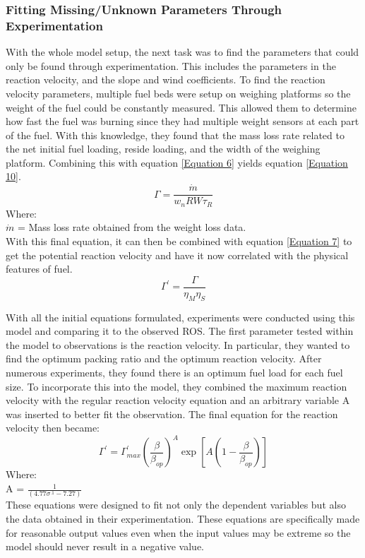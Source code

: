 \documentclass{article}
\begin{document}
 \subsubsection{Fitting Missing/Unknown Parameters Through Experimentation}
 \indent With the whole model setup, the next task was to find the parameters that could only be found through experimentation. This includes the parameters in the reaction velocity, and the slope and wind coefficients. To find the reaction velocity parameters, multiple fuel beds were setup on weighing platforms so the weight of the fuel could be constantly measured. This allowed them to determine how fast the fuel was burning since they had multiple weight sensors at each part of the fuel. With this knowledge, they found that the mass loss rate related to the net initial fuel loading, reside loading, and the width of the weighing platform. Combining this with equation \ref{Equation 6} yields equation \ref{Equation 10}.
 \begin{equation}
 	\label{Equation 10}
 	\Gamma = \frac {\dot m } {w_n RW \tau _ R} 
 \end{equation}
 Where: \\
 $\dot m$ = Mass loss rate obtained from the weight loss data. \\
 \indent With this final equation, it can then be combined with equation \ref{Equation 7} to get the potential reaction velocity and have it now correlated with the physical features of fuel. 
 \begin{equation}
 	\label{Equation 11}
 	\Gamma ^ {'} = \frac {\Gamma} {\eta _ M \eta _ S}
 \end{equation}
 
\indent With all the initial equations formulated, experiments were conducted using this model and comparing it to the observed ROS. The first parameter tested within the model to observations is the reaction velocity. In particular, they wanted to find the optimum packing ratio and the optimum reaction velocity. After numerous experiments, they found there is an optimum fuel load for each fuel size. To incorporate this into the model, they combined the maximum reaction velocity with the regular reaction velocity equation and an arbitrary variable A was inserted to better fit the observation. The final equation for the reaction velocity then became: 
\begin{equation}
	\label{Final Reaction Velocity}
	\Gamma ^ {'} = \Gamma ^ {'}_{max} (\frac {\beta} {\beta _ {op}}) ^ {A} \exp[A(1 - \frac {\beta} {\beta _ {op}})]
\end{equation}
Where: \\
A = $\frac {1} {(4.77 \sigma ^ {.1} - 7.27)}$\\
\indent These equations were designed to fit not only the dependent variables but also the data obtained in their experimentation. These equations are specifically made for reasonable output values even when the input values may be extreme so the model should never result in a negative value.
\end{document}
